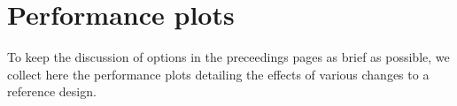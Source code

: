 
\chapter*{Performance plots}
\label{cha:performance-plots}

To keep the discussion of options in the preceedings pages as brief as
possible, we collect here the performance plots detailing the effects
of various changes to a reference design.
